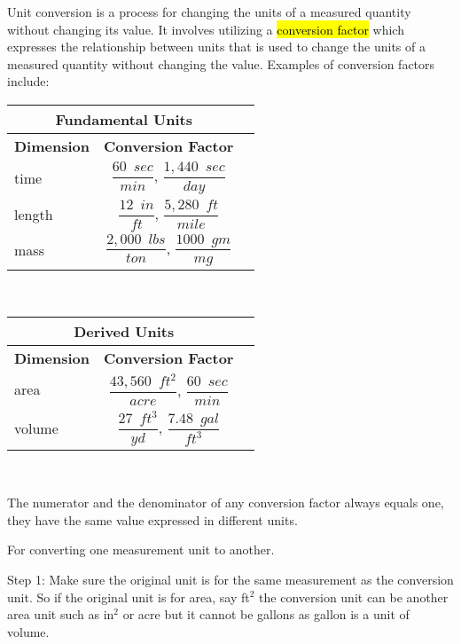 \documentclass{article}
\begin{document}
\begin{enumerate}
Unit conversion is a process for changing the units of a measured quantity without changing its value.  It involves 
utilizing a \hl{conversion factor} which expresses the relationship between units that is used to change the units of a measured quantity without changing the value. Examples of conversion factors include:\\

\begin{center}
\renewcommand{\arraystretch}{1.5}
\vspace{0.5cm}
\begin{tabular}{l| c c }
\hline
\multicolumn{2}{c}{\textbf{Fundamental Units}} \\
\hline
\textbf{Dimension} & \textbf{Conversion Factor}\\[0.5cm]

\hspace{0.3cm}
time & $\dfrac{60 \enspace sec}{min}$, $\dfrac{1,440\enspace sec}{day}$\\[0.5cm]
length & $\dfrac{12 \enspace in}{ft}$, $\dfrac{5,280 \enspace ft}{mile}$\\[0.5cm]
mass & $\dfrac{2,000 \enspace lbs}{ton}$, $\dfrac{1000 \enspace gm}{mg}$\\
\end{tabular}\\
\begin{tabular}{l| c c }
\hline
\multicolumn{2}{c}{\textbf{Derived Units}} \\
\hline
\textbf{Dimension} & \textbf{Conversion Factor}\\[0.5cm]

\hspace{0.3cm}
area & $\dfrac{43,560 \enspace ft^2}{acre}$, $\dfrac{60 \enspace sec}{min}$\\[0.5cm]
volume & $\dfrac{27 \enspace ft^3}{yd}$, $\dfrac{7.48 \enspace gal}{ft^3}$\\
\end{tabular}\\
\end{center}
\vspace{0.5cm}

The numerator and the denominator of any conversion factor always equals one, they have the same value expressed in different units.

For converting one measurement unit to another.

Step 1:  Make sure the original unit is for the same measurement as the conversion unit.  So if the original unit is for area, say ft$^2$ the conversion unit can be another area unit such as in$^2$ or acre but it cannot be gallons as gallon is a unit of volume.


\end{enumerate}
\end{document}
